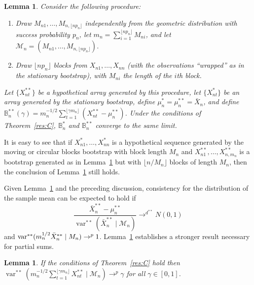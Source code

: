 \documentclass[12pt]{article}
\newtheorem{lem}[thm]{Lemma}
\theoremstyle{definition}
\DeclareMathOperator{\var}{var}
\begin{document}
\begin{lem}\label{res:A}
  Consider the following procedure:
  \begin{enumerate}
  \item Draw $M_{n1},\dots,M_{n,\lfloor n p_n \rfloor}$ independently from
    the geometric distribution with success probability $p_n$, let
    $m_n = \sum_{i=1}^{\lfloor n p_n \rfloor} M_{ni}$, and let
    $\mathcal{M}_n = (M_{n1},\dots,M_{n,\lfloor n p_n \rfloor})$.
  \item Draw $\lfloor n p_n \rfloor$ blocks from $X_{n1},\dots,X_{nn}$
    (with the observations ``wrapped'' as in the stationary
    bootstrap), with $M_{ni}$ the length of the $i$th block.
  \end{enumerate}
  Let $\{X_{nt}^{**}\}$ be a hypothetical array generated by this
  procedure, let $\{X_{nt}^{*}\}$ be an array generated by the
  stationary bootstrap, define $\mu^{*}_n = \mu_n^{**} = \bar X_n$,
  and define $\mathbb{B}_n^{**}(\gamma) = m_n^{-1/2}
  \sum_{t=1}^{\lfloor \gamma m_n \rfloor} (X_{nt}^{**} - \mu_n^{**})$.
  Under the conditions of Theorem~\ref{res:C}, $\mathbb{B}_n^{*}$ and
  $\mathbb{B}_n^{**}$ converge to the same limit.
\end{lem}

It is easy to see that if $X_{n1}^*,\dots,X_{nn}^*$ is a hypothetical
sequence generated by the moving or circular blocks bootstrap with
block length $M_n$ and $X_{n1}^{**},\dots,X_{n,m_n}^{**}$ is a
bootstrap generated as in Lemma~\ref{res:A} but with $\lfloor n/M_n
\rfloor$ blocks of length $M_n$, then the conclusion of
Lemma~\ref{res:A} still holds.

Given Lemma~\ref{res:A} and the preceding discussion, consistency for
the distribution of the sample mean can be expected to hold if
\begin{equation}\label{eq:5}
  \frac{\bar{X}^{**}_n - \mu_n^{**}}{\var^{**}(\bar{X}_n^{**} \mid
    \mathcal{M}_n)} \to^{d^{**}} N(0,1)
\end{equation}
and $\var^{**}(m_{n}^{1/2} \bar X_n^{**} \mid \mathcal
\mathcal{M}_n) \to^p 1$.  Lemma~\ref{res:B} establishes a stronger
result necessary for partial sums.

\begin{lem}\label{res:B}  
  If the conditions of Theorem~\ref{res:C} hold then
  $\var^{**}(m_n^{-1/2} \sum_{t=1}^{\lfloor \gamma m_n \rfloor}
  X_{nt}^{**} \mid \mathcal{M}_n) \to^p \gamma$ for all
  $\gamma \in [0,1]$.
\end{lem}
\end{document}
